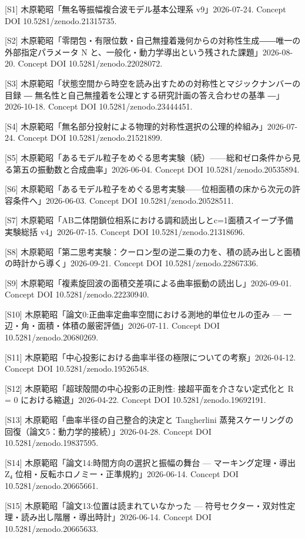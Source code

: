 \documentclass[
  a4paper,
]{ltjsarticle}
\begin{document}
{[}S1{]} 木原範昭「無名等振幅複合波モデル基本公理系 v9」2026-07-24.
Concept DOI 10.5281/zenodo.21315735.

{[}S2{]}
木原範昭「零閉包・有限位数・自己無撞着幾何からの対称性生成――唯一の外部指定パラメータ
N と、一般化・動力学導出という残された課題」2026-08-20. Concept DOI
10.5281/zenodo.22028072.

{[}S3{]}
木原範昭「状態空間から時空を読み出すための対称性とマジックナンバーの目録
― 無名性と自己無撞着を公理とする研究計画の答え合わせの基準
―」2026-10-18. Concept DOI 10.5281/zenodo.23444451.

{[}S4{]}
木原範昭「無名部分投射による物理的対称性選択の公理的枠組み」2026-07-24.
Concept DOI 10.5281/zenodo.21521899.

{[}S5{]}
木原範昭「あるモデル粒子をめぐる思考実験（続）------総和ゼロ条件から見る第五の振動数と合成曲率」2026-06-04.
Concept DOI 10.5281/zenodo.20535894.

{[}S6{]}
木原範昭「あるモデル粒子をめぐる思考実験------位相面積の床から次元の許容条件へ」2026-06-03.
Concept DOI 10.5281/zenodo.20528511.

{[}S7{]}
木原範昭「AB二体閉鎖位相系における調和読出しとc=1面積スイープ予備実験総括
v4」2026-07-15. Concept DOI 10.5281/zenodo.21318696.

{[}S8{]}
木原範昭「第二思考実験：クーロン型の逆二乗の力を、積の読み出しと面積の時計から導く」2026-09-21.
Concept DOI 10.5281/zenodo.22867336.

{[}S9{]}
木原範昭「複素旋回波の面積交差項による曲率振動の読出し」2026-09-01.
Concept DOI 10.5281/zenodo.22230940.

{[}S10{]} 木原範昭「論文0:正曲率定曲率空間における測地的単位セルの歪み
--- 一辺・角・面積・体積の厳密評価」2026-07-11. Concept DOI
10.5281/zenodo.20680269.

{[}S11{]}
木原範昭「中心投影における曲率半径の極限についての考察」2026-04-12.
Concept DOI 10.5281/zenodo.19526548.

{[}S12{]} 木原範昭「超球殻間の中心投影の正則性:
接超平面を介さない定式化と R = 0 における縮退」2026-04-22. Concept DOI
10.5281/zenodo.19692191.

{[}S13{]} 木原範昭「曲率半径の自己整合的決定と Tangherlini
蒸発スケーリングの回復（論文5：動力学的接続）」2026-04-28. Concept DOI
10.5281/zenodo.19837595.

{[}S14{]} 木原範昭「論文14:時間方向の選択と振幅の舞台 ---
マーキング定理・導出 Z₄ 位相・反転ホロノミー・正準規約」2026-06-14.
Concept DOI 10.5281/zenodo.20665661.

{[}S15{]} 木原範昭「論文13:位置は読まれていなかった ---
符号セクター・双対性定理・読み出し階層・導出時計」2026-06-14. Concept
DOI 10.5281/zenodo.20665633.
\end{document}
